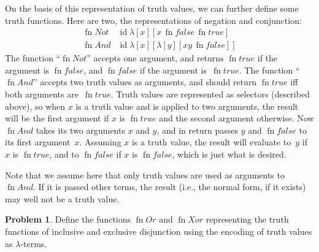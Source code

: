 \documentclass[10pt,a4paper]{article}
\theoremstyle{plain}
\theoremstyle{definition}
\newtheorem{prob}{Problem}[section]
\theoremstyle{remark}
\providecommand{\lambd}{\ensuremath{\lambda}}
\providecommand{\ident}{\operatorname{id}}
\providecommand{\fn}{\operatorname{fn}}
\providecommand{\fn}{\operatorname{fn}}
\begin{document}
On the basis of this representation of truth values, we can further
define some truth functions. Here are two, the representations of
negation and conjunction:
\begin{align*}
  \fn{Not} & \ident \lambd[x][x\, \fn{false}\, \fn{true}]\\
  \fn{And} & \ident \lambd[x][\lambd[y][xy \,\fn{false}]]
\end{align*}
The function ``$\fn{Not}$'' accepts one argument, and returns
$\fn{true}$ if the argument is $\fn{false}$, and $\fn{false}$ if the
argument is~$\fn{true}$.  The function ``$\fn{And}$'' accepts two
truth values as arguments, and should return $\fn{true}$ iff both
arguments are~$\fn{true}$. Truth values are represented as selectors
(described above), so when $x$ is a truth value and is applied to two
arguments, the result will be the first argument if $x$ is $\fn{true}$
and the second argument otherwise. Now $\fn{And}$ takes its two
arguments $x$ and $y$, and in return passes $y$ and $\fn{false}$ to
its first argument~$x$. Assuming $x$ is a truth value, the result
will evaluate to~$y$ if $x$ is $\fn{true}$, and to $\fn{false}$ if $x$
is $\fn{false}$, which is just what is desired.

Note that we assume here that only truth values are used as arguments
to $\fn{And}$. If it is passed other terms, the result (i.e., the
normal form, if it exists) may well not be a truth value.

\begin{prob}
  Define the functions $\fn{Or}$ and $\fn{Xor}$ representing the truth
  functions of inclusive and exclusive disjunction using the encoding
  of truth values as $\lambd$-terms.
\end{prob}
\end{document}
